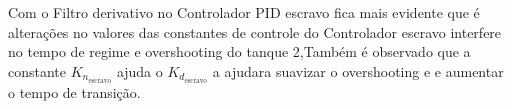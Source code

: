 Com o Filtro derivativo no Controlador PID escravo fica mais evidente que é alterações no valores das constantes de
controle do Controlador escravo interfere no tempo de regime e overshooting do tanque 2,Também é observado que
a constante $K_{n_{\textrm{escravo}}}$ ajuda o  $K_{d_{\textrm{escravo}}}$ a ajudara suavizar o overshooting e
e aumentar o tempo de transição.